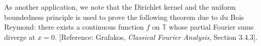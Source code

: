 \begin{remark}
	As another application, we note that the Dirichlet kernel and the uniform boundedness principle is used to prove the following theorem due to du Bois Reymond: there exists a continuous function $f$ on $\mathbb{T}$ whose partial Fourier sums diverge at $x=0$. [Reference: Grafakos, \emph{Classical Fourier Analysis}, Section 3.4.3].
\end{remark}